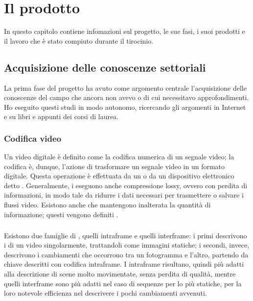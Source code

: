 \chapter{Il prodotto\label{cap:ilprodotto}}
In questo capitolo contiene infomazioni sul progetto, le sue fasi, i suoi prodotti e il lavoro che è stato compiuto durante il tirocinio.

\section{Acquisizione delle conoscenze settoriali}
La prima fase del progetto ha avuto come argomento centrale l'acquisizione delle conoscenze del campo che ancora non avevo o di cui necessitavo approfondimenti. Ho eseguito questi studi in modo autonomo, ricercando gli argomenti in Internet e su libri e appunti dei corsi di laurea.

	\subsection{Codifica video}
	Un video digitale è definito come la codifica numerica di un segnale video; la codifica è, dunque, l'azione di trasformare un segnale video in un formato digitale. Questa operazione è effettuata da un  o da un dispositivo elettronico detto . Generalmente, i  eseguono anche compressione lossy, ovvero con perdita di informazioni, in modo tale da ridurre i dati necessari per trasmettere o salvare i flussi video. Esistono anche  che mantengono inalterata la quantità di informazione; questi vengono definiti .
	\paragraph*{}
	Esistono due famiglie di , quelli intraframe e quelli interframe:
	i primi descrivono i  di un video singolarmente, trattandoli come immagini statiche; i secondi, invece, descrivono i cambiamenti che occorrono tra un fotogramma e l'altro, partendo da  chiave descritti con codifica intraframe. I  intraframe risultano, quindi più adatti alla descrizione di scene molto movimentate, senza perdita di qualità, mentre quelli interframe sono più adatti nel caso di sequenze per lo più statiche, per la loro notevole efficienza nel descrivere i pochi cambiamenti avvenuti.

